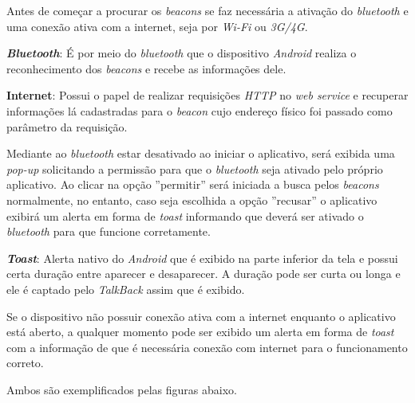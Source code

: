 Antes de começar a procurar os \textit{beacons} se faz necessária a ativação do \textit{bluetooth} e uma conexão ativa com a internet, seja por \textit{Wi-Fi} ou \textit{3G/4G}.

\textbf{\textit{Bluetooth}}: É por meio do \textit{bluetooth} que o dispositivo \textit{Android} realiza o reconhecimento dos \textit{beacons} e recebe as informações dele.

\textbf{Internet}: Possui o papel de realizar requisições \textit{HTTP} no \textit{web service} e recuperar informações lá cadastradas para o \textit{beacon} cujo endereço físico foi passado como parâmetro da requisição.

Mediante ao \textit{bluetooth} estar desativado ao iniciar o aplicativo, será exibida uma \textit{pop-up} solicitando a permissão para que o \textit{bluetooth} seja ativado pelo próprio aplicativo. Ao clicar na opção ''permitir'' será iniciada a busca pelos \textit{beacons} normalmente, no entanto, caso seja escolhida a opção ''recusar'' o aplicativo exibirá um alerta em forma de \textit{toast} informando que deverá ser ativado o \textit{bluetooth} para que funcione corretamente.

\textbf{\textit{Toast}}: Alerta nativo do \textit{Android} que é exibido na parte inferior da tela e possui certa duração entre aparecer e desaparecer. A duração pode ser curta ou longa e ele é captado pelo \textit{TalkBack} assim que é exibido.

Se o dispositivo não possuir conexão ativa com a internet enquanto o aplicativo está aberto, a qualquer momento pode ser exibido um alerta em forma de \textit{toast} com a informação de que é necessária conexão com internet para o funcionamento correto.

Ambos são exemplificados pelas figuras abaixo.

